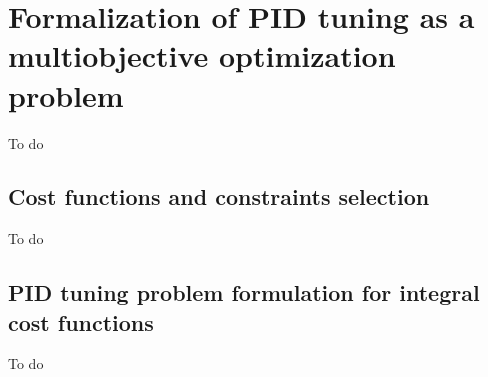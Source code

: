 %
\section{Formalization of PID tuning as a multiobjective optimization problem}
\label{sec:FormPIDMOOP}
To do
\subsection{Cost functions and constraints selection}
\label{sec:CostFunSelec}
To do
\subsection{PID tuning problem formulation for integral cost functions}
\label{sec:CostProbPID}
To do
